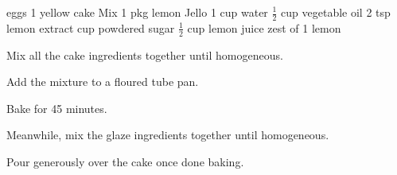 \dishtype{}
\begin{ingreds}
     eggs
        1 yellow cake Mix
        1 pkg lemon Jello
        1 cup water
        $\frac{1}{2}$ cup vegetable oil
        2 tsp lemon extract
    \columnbreak{}
     cup powdered sugar
        $\frac{1}{2}$ cup lemon juice
        zest of 1 lemon
\end{ingreds}
\begin{method}
    Mix all the cake ingredients together until homogeneous.\par
    Add the mixture to a floured tube pan.\par
    Bake for 45 minutes.\par
    Meanwhile, mix the glaze ingredients together until homogeneous.\par
    Pour generously over the cake once done baking.
\end{method}